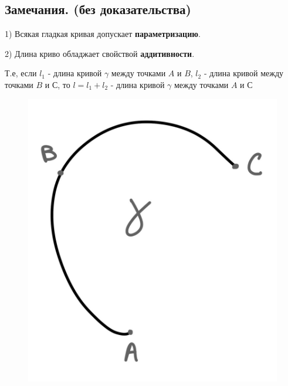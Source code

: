 {\subsection*{Замечания. (без доказательства)}
1) Всякая гладкая кривая допускает \textbf{параметризацию}.

2) Длина криво обладжает свойствой \textbf{аддитивности}.

Т.е, если \(l_1\) - длина кривой \(\gamma\) между точками \(A\) и \(B\), \(l_2\) - длина кривой между точками \(B\) и \( С\), то \(l = l_1 + l_2\) - длина кривой \(\gamma\) между  точками \(A\) и \(С\)
\begin{figure}[h!]
    \centering
    \includegraphics[width=0.4\linewidth]{source/4.png}
    \label{fig:enter-label}
\end{figure}
}
